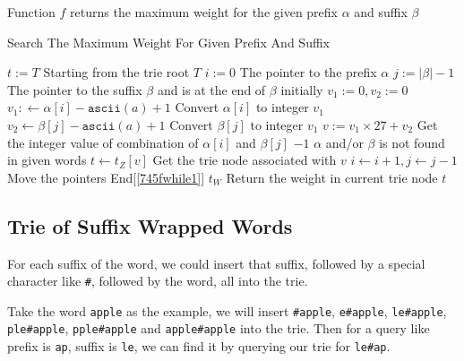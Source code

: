 \documentclass[a4paper,12pt]{article}
\begin{document}
Function $f$ returns the maximum weight for the given prefix $\alpha$ and suffix $\beta$
\begin{algorithm}[H]
\caption{Search The Maximum Weight For Given Prefix And Suffix}
\begin{algorithmic}[1]
\State $t:=T$ \Comment Starting from the trie root $T$
\State $i:=0$ \Comment The pointer to the prefix $\alpha$
\State $j:=|\beta| - 1$ \Comment The pointer to the suffix $\beta$ and is at the end of $\beta$ initially
 \label{745fwhile1}
\State $v_1:=0, v_2:=0$
\State $v_1:\gets\alpha[i] - \texttt{ascii}(a) + 1$ \Comment Convert $\alpha[i]$ to integer $v_1$
\EndIf
{}
\State $v_2\gets\beta[j] - \texttt{ascii}(a) + 1$ \Comment Convert $\beta[j]$ to integer $v_1$
\EndIf
\State $v:=v_1\times 27 + v_2$ \Comment Get the integer value of combination of $\alpha[i]$ and $\beta[j]$
\State \Return $-1$ \Comment $\alpha$ and/or $\beta$ is not found in given words
\Else
\State $t\gets t_{Z}[v]$ \Comment Get the trie node associated with $v$
\EndIf
\State $i\gets i+1, j\gets j-1$ \Comment Move the pointers 
\EndWhile \Comment End[\ref{745fwhile1}]
\State \Return $t_{W}$ \Comment Return the weight in current trie node $t$
\EndProcedure
\end{algorithmic}
\end{algorithm}
\subsection{Trie of Suffix Wrapped Words}
For each suffix of the word, we could insert that suffix, followed by a special character like \texttt{\#}, followed by the word, all into the trie.
\par
Take the word \texttt{apple} as the example, we will insert \texttt{\#apple}, \texttt{e\#apple}, \texttt{le\#apple}, \texttt{ple\#apple}, \texttt{pple\#apple} and \texttt{apple\#apple} into the trie. Then for a query like prefix is \texttt{ap}, suffix is \texttt{le}, we can find it by querying our trie for \texttt{le\#ap}.
\end{document}
